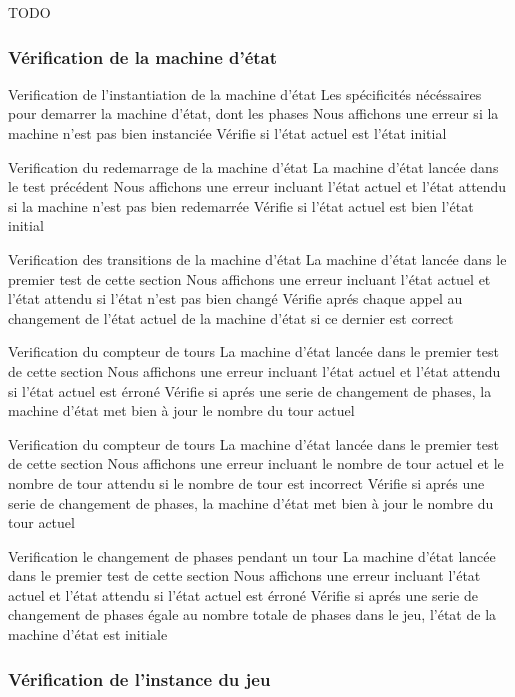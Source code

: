 TODO

\subsubsection{Vérification de la machine d'état}
\mytest
{Verification de l'instantiation de la machine d'état}
{Les spécificités nécéssaires pour demarrer la machine d'état, dont les phases}
{Nous affichons une erreur si la machine n'est pas bien instanciée}
{Vérifie si l'état actuel est l'état initial}

\mytest
{Verification du redemarrage de la machine d'état}
{La machine d'état lancée dans le test précédent}
{Nous affichons une erreur incluant l'état actuel et l'état attendu si la machine n'est pas bien redemarrée}
{Vérifie si l'état actuel est bien l'état initial}

\mytest
{Verification des transitions de la machine d'état}
{La machine d'état lancée dans le premier test de cette section}
{Nous affichons une erreur incluant l'état actuel et l'état attendu si l'état n'est pas bien changé}
{Vérifie aprés chaque appel au changement de l'état actuel de la machine d'état si ce dernier est correct}

\mytest
{Verification du compteur de tours}
{La machine d'état lancée dans le premier test de cette section}
{Nous affichons une erreur incluant l'état actuel et l'état attendu si l'état actuel est érroné}
{Vérifie si aprés une serie de changement de phases, la machine d'état met bien à jour le nombre du tour actuel}

\mytest
{Verification du compteur de tours}
{La machine d'état lancée dans le premier test de cette section}
{Nous affichons une erreur incluant le nombre de tour actuel et le nombre de tour attendu si le nombre de tour est incorrect}
{Vérifie si aprés une serie de changement de phases, la machine d'état met bien à jour le nombre du tour actuel}

\mytest
{Verification le changement de phases pendant un tour}
{La machine d'état lancée dans le premier test de cette section}
{Nous affichons une erreur incluant l'état actuel et l'état attendu si l'état actuel est érroné}
{Vérifie si aprés une serie de changement de phases égale au nombre totale de phases dans le jeu, l'état de la machine d'état est initiale}

\subsubsection{Vérification de l'instance du jeu}

